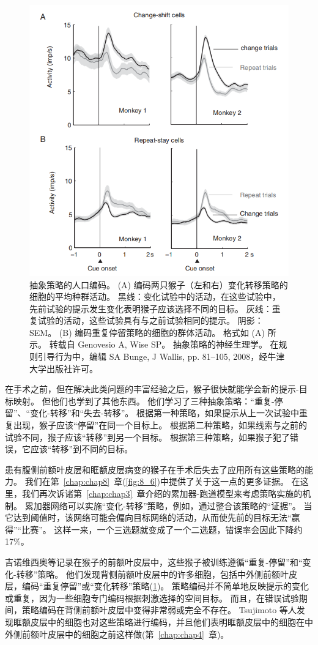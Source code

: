  \begin{figure}
	\centering
	\includegraphics[width=0.6\linewidth]{image_pfc/Fig_7_11}
	\caption{抽象策略的人口编码。
		 (A) 编码两只猴子（左和右）变化转移策略的细胞的平均种群活动。
		 黑线：变化试验中的活动，在这些试验中，先前试验的提示发生变化表明猴子应该选择不同的目标。
		 灰线：重复试验的活动，这些试验具有与之前试验相同的提示。
		 阴影：SEM。 (B) 编码重复停留策略的细胞的群体活动。
		 格式如 (A) 所示。 转载自 Genovesio A, Wise SP。
		 抽象策略的神经生理学。
		 在规则引导行为中，编辑 SA Bunge, J Wallis, pp. 81–105, 2008，经牛津大学出版社许可。\label{fig:7_11}}
\end{figure}
\par


在手术之前，但在解决此类问题的丰富经验之后，猴子很快就能学会新的提示-目标映射。
但他们也学到了其他东西。 他们学习了三种抽象策略：“重复-停留”、“变化-转移”和“失去-转移”。
根据第一种策略，如果提示从上一次试验中重复出现，猴子应该“停留”在同一个目标上。
根据第二种策略，如果线索与之前的试验不同，猴子应该“转移”到另一个目标。
根据第三种策略，如果猴子犯了错误，它应该“转移”到不同的目标。
\par


患有腹侧前额叶皮层和眶额皮层病变的猴子在手术后失去了应用所有这些策略的能力\cite{bussey2001role}。
我们在第~\ref{chap:chap8}~章(\ref{fig:8_6})中提供了关于这一点的更多证据。
在这里，我们再次诉诸第~\ref{chap:chap3}~章介绍的累加器-跑道模型来考虑策略实施的机制。 
累加器网络可以实施“变化-转移”策略，例如，通过整合该策略的“证据”。
当它达到阈值时，该网络可能会偏向目标网络的活动，从而使先前的目标无法“赢得”“比赛”。
这样一来，一个三选题就变成了一个二选题，错误率会因此下降约 17\%。
\par


吉诺维西奥等\cite{genovesio2005prefrontal}记录在猴子的前额叶皮层中，这些猴子被训练遵循“重复-停留”和“变化-转移”策略。
他们发现背侧前额叶皮层中的许多细胞，包括中外侧前额叶皮层，编码“重复停留”或“变化转移”策略(\ref{fig:7_11})。
策略编码并不简单地反映提示的变化或重复，因为一些细胞专门编码根据刺激选择的空间目标。
而且，在错误试验期间，策略编码在背侧前额叶皮层中变得非常弱或完全不存在\cite{genovesio2008encoding}。
Tsujimoto 等人\cite{tsujimoto2011comparison}发现眶额皮层中的细胞也对这些策略进行编码，并且他们表明眶额皮层中的细胞在中外侧前额叶皮层中的细胞之前这样做(第~\ref{chap:chap4}~章)。
\par 


